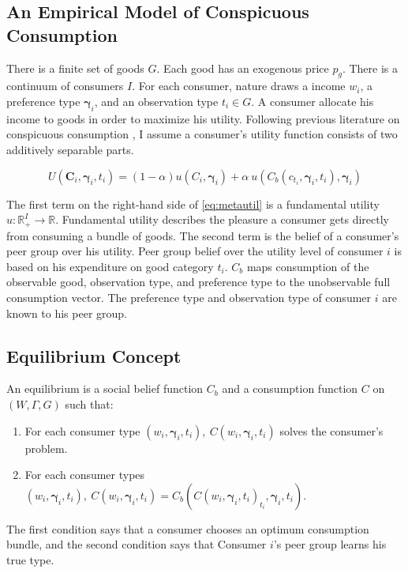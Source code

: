 \documentclass[11pt]{article}
\begin{document}
\begin{CJK}{UTF8}{gbsn}
\section{An Empirical Model of Conspicuous Consumption}

There is a finite set of goods $G$.  Each good has an exogenous price $p_g$.  There is a continuum of consumers $I$. For each consumer, nature draws a income $w_i$, a preference type $\boldsymbol{\gamma}_i$, and an observation type $t_i \in G$.  A consumer allocate his income to goods in order to maximize his utility.  Following previous literature on conspicuous consumption \citep{heffetz2011,Ireland1994}, I assume a consumer's utility function consists of two additively separable parts.

\begin{equation}
    \label{eq:metautil}
    U(\mathbf{C}_i,\boldsymbol{\gamma}_i,t_i) = (1-\alpha) u(C_i,\boldsymbol{\gamma}_i) + \alpha\  u(C_b(c_{t_i},\boldsymbol{\gamma}_i,t_i),\boldsymbol{\gamma}_i)
\end{equation}

The first term on the right-hand side of \eqref{eq:metautil} is a fundamental utility $u:\mathbb{R}_+^{I}\rightarrow\mathbb{R}$.  
Fundamental utility describes the pleasure a consumer gets directly from consuming a bundle of goods.
The second term is the belief of a consumer's peer group over his utility.  Peer group belief over the utility level of consumer $i$ is based on his expenditure on good category $t_i$.  $C_b$ maps consumption of the observable good, observation type, and preference type to the unobservable full consumption vector.  The preference type and observation type of consumer $i$ are known to his peer group.\footnotemark{}

\subsection{Equilibrium Concept}

An equilibrium is a social belief function $C_b$ and a consumption function $C$ on $(W,\Gamma,G)$ such that:
\begin{enumerate}
    \item For each consumer type $(w_i,\boldsymbol{\gamma}_i,t_i), \ C(w_i,\boldsymbol{\gamma}_i,t_i)$ solves the consumer's problem.
    \item For each consumer types $(w_i,\boldsymbol{\gamma}_i,t_i), \ C(w_i,\boldsymbol{\gamma}_i,t_i) = C_b(C(w_i,\boldsymbol{\gamma}_i,t_i)_{t_i},\boldsymbol{\gamma}_i,t_i).$
\end{enumerate}
The first condition says that a consumer chooses an optimum consumption bundle, and the second condition says that Consumer $i$'s peer group learns his true type.


\end{CJK}
\end{document}
